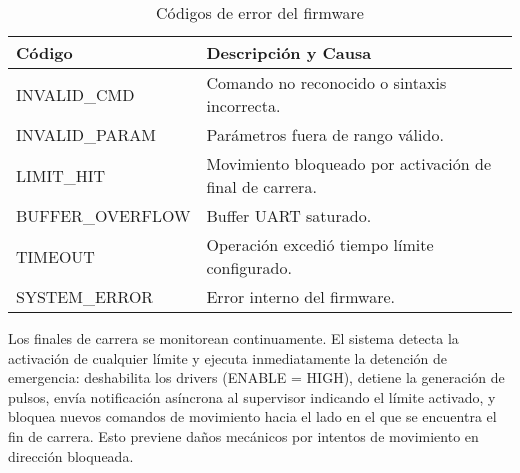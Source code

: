 \begin{table}[H]
\centering
\begin{tabular}{|l|p{9cm}|}
\hline
\textbf{Código} & \textbf{Descripción y Causa} \\
\hline
INVALID\_CMD & Comando no reconocido o sintaxis incorrecta. \\
\hline
INVALID\_PARAM & Parámetros fuera de rango válido. \\
\hline
LIMIT\_HIT & Movimiento bloqueado por activación de final de carrera. \\
\hline
BUFFER\_OVERFLOW & Buffer UART saturado. \\
\hline
TIMEOUT & Operación excedió tiempo límite configurado. \\
\hline
SYSTEM\_ERROR & Error interno del firmware. \\
\hline
\end{tabular}
\caption{Códigos de error del firmware}
\label{tab:codigos_error}
\end{table}

Los finales de carrera se monitorean continuamente. El sistema detecta la activación de cualquier límite y ejecuta inmediatamente la detención de emergencia: deshabilita los drivers (ENABLE = HIGH), detiene la generación de pulsos, envía notificación asíncrona al supervisor indicando el límite activado, y bloquea nuevos comandos de movimiento hacia el lado en el que se encuentra el fin de carrera. Esto previene daños mecánicos por intentos de movimiento en dirección bloqueada.
